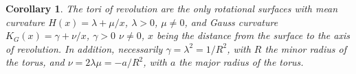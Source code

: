 \documentclass[leqno,11pt]{amsart}
\newtheorem{corollary}[theorem]{Corollary}
\theoremstyle{definition}
\numberwithin{equation}{section}
\begin{document}
\begin{corollary}\label{cor:tori}
	The tori of revolution are the only rotational surfaces with mean curvature $H(x)=\lambda +\mu / x$, $\lambda >0$, $\mu \neq 0$,
	and Gauss curvature $K_G (x)=\gamma + \nu /x$, $\gamma >0$ $\nu \neq 0$, $x$ being the distance from the surface to the axis of revolution. In addition, necessarily $\gamma=\lambda^2= 1/R^2$, with $R$ the minor radius of the torus, and $\nu=2 \lambda \mu= -a/R^2$, with $a$ the major radius of the torus.	
\end{corollary}




\end{document}
